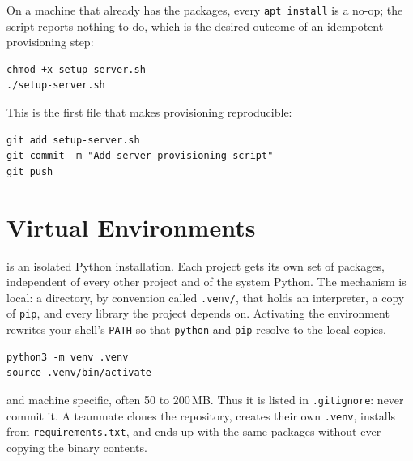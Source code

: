 On a machine that already has the packages, every \texttt{apt install} is a
no-op; the script reports nothing to do, which is the desired outcome of
an idempotent provisioning step:

\begin{verbatim}
chmod +x setup-server.sh
./setup-server.sh
\end{verbatim}

 This is the first file that makes provisioning reproducible:

\begin{verbatim}
git add setup-server.sh
git commit -m "Add server provisioning script"
git push
\end{verbatim}



\newpage
\section{Virtual Environments}

 is an isolated Python installation.
Each project gets its own set of packages, independent of every other project
and of the system Python.
The mechanism is local: a directory, by convention called \texttt{.venv/},
that holds an interpreter, a copy of \texttt{pip}, and every library the
project depends on.
Activating the environment rewrites your shell's \texttt{PATH} so that
\texttt{python} and \texttt{pip} resolve to the local copies.

\begin{verbatim}
python3 -m venv .venv
source .venv/bin/activate
\end{verbatim}


 and machine specific, often 50 to 200\,MB.
Thus it is listed in \texttt{.gitignore}: never commit it.
A teammate clones the repository, creates their own \texttt{.venv}, installs
from \texttt{requirements.txt}, and ends up with the same packages without
ever copying the binary contents.

